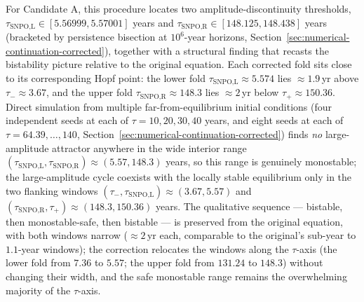 \documentclass[twocolumn,10pt]{article}
\begin{document}
For Candidate A, this procedure locates two amplitude-discontinuity thresholds, $\tau_{\text{SNPO,L}}\in[5.56999,5.57001]$ years and $\tau_{\text{SNPO,R}}\in[148.125,148.438]$ years (bracketed by persistence bisection at $10^6$-year horizons, Section~\ref{sec:numerical-continuation-corrected}), together with a structural finding that recasts the bistability picture relative to the original equation. Each corrected fold sits close to its corresponding Hopf point: the lower fold $\tau_{\text{SNPO,L}}\approx5.574$ lies $\approx1.9$\,yr above $\tau_-\approx3.67$, and the upper fold $\tau_{\text{SNPO,R}}\approx148.3$ lies $\approx2$\,yr below $\tau_+\approx150.36$. Direct simulation from multiple far-from-equilibrium initial conditions (four independent seeds at each of $\tau=10,20,30,40$ years, and eight seeds at each of $\tau=64.39,\dots,140$, Section~\ref{sec:numerical-continuation-corrected}) finds \emph{no} large-amplitude attractor anywhere in the wide interior range $(\tau_{\text{SNPO,L}},\tau_{\text{SNPO,R}})\approx(5.57,148.3)$ years, so this range is genuinely monostable; the large-amplitude cycle coexists with the locally stable equilibrium only in the two flanking windows $(\tau_-,\tau_{\text{SNPO,L}})\approx(3.67,5.57)$ and $(\tau_{\text{SNPO,R}},\tau_+)\approx(148.3,150.36)$ years. The qualitative sequence --- bistable, then monostable-safe, then bistable --- is preserved from the original equation, with both windows narrow ($\approx2$\,yr each, comparable to the original's sub-year to $1.1$-year windows); the correction relocates the windows along the $\tau$-axis (the lower fold from $7.36$ to $5.57$; the upper fold from $131.24$ to $148.3$) without changing their width, and the safe monostable range remains the overwhelming majority of the $\tau$-axis.
\end{document}
